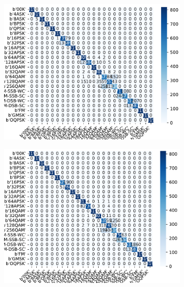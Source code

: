 \begin{figure}[ht]
\begin{subfigure}[b]{0.45\textwidth}
      \label{fig:image2}
    \end{subfigure}
    \hfill
    \begin{subfigure}[b]{0.45\textwidth}
        \includegraphics[width=\textwidth]{Image/resnet_18a.pdf}
        \label{fig:image2}
      \end{subfigure}
      \hfill
      \begin{subfigure}[b]{0.45\textwidth}
        \includegraphics[width=\textwidth]{Image/senet_18a.pdf}
        \label{fig:image2}
      \end{subfigure}
      \hfill
      \begin{subfigure}[b]{0.45\textwidth}

\end{subfigure}
\end{figure}
